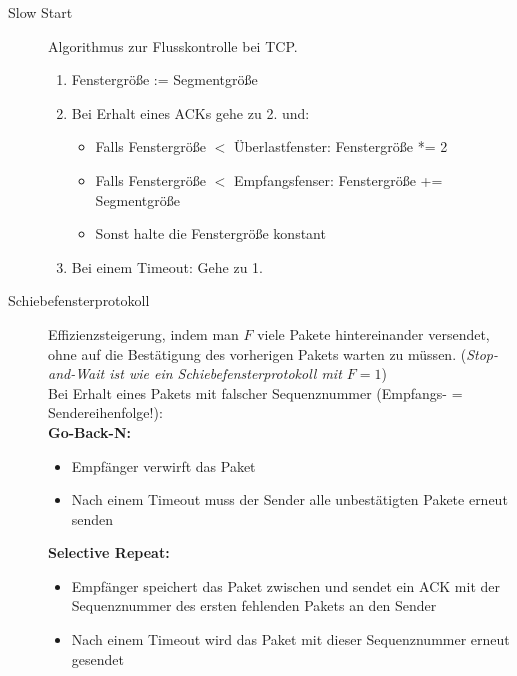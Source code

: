 \documentclass[a4paper]{article}
\begin{document}
\begin{description}
    \item[Slow Start]
    \begin{samepage}
    Algorithmus zur Flusskontrolle bei TCP.
    \begin{enumerate}
        \item Fenstergröße := Segmentgröße
        \item Bei Erhalt eines ACKs gehe zu 2. und:
        \begin{itemize}
            \item Falls Fenstergröße $<$ Überlastfenster: Fenstergröße *= 2
            \item Falls Fenstergröße $<$ Empfangsfenser: Fenstergröße += Segmentgröße
            \item Sonst halte die Fenstergröße konstant
        \end{itemize}
        \item Bei einem Timeout: Gehe zu 1.
    \end{enumerate}
    \end{samepage}
    \item[Schiebefensterprotokoll]
    \begin{samepage}
    Effizienzsteigerung, indem man $F$ viele Pakete hintereinander versendet, ohne auf die Bestätigung des vorherigen Pakets warten zu müssen. (\textit{Stop-and-Wait ist wie ein Schiebefensterprotokoll mit $F = 1$})
    \bigskip \\
    Bei Erhalt eines Pakets mit falscher Sequenznummer (Empfangs- = Sendereihenfolge!): \\
    \textbf{Go-Back-N:}
    \begin{itemize}
        \item Empfänger verwirft das Paket
        \item Nach einem Timeout muss der Sender alle unbestätigten Pakete erneut senden
    \end{itemize}
    \textbf{Selective Repeat:}
    \begin{itemize}
        \item Empfänger speichert das Paket zwischen und sendet ein ACK mit der Sequenznummer des ersten fehlenden Pakets an den Sender
        \item Nach einem Timeout wird das Paket mit dieser Sequenznummer erneut gesendet
    \end{itemize}
    \end{samepage}
\end{description}
\end{document}
